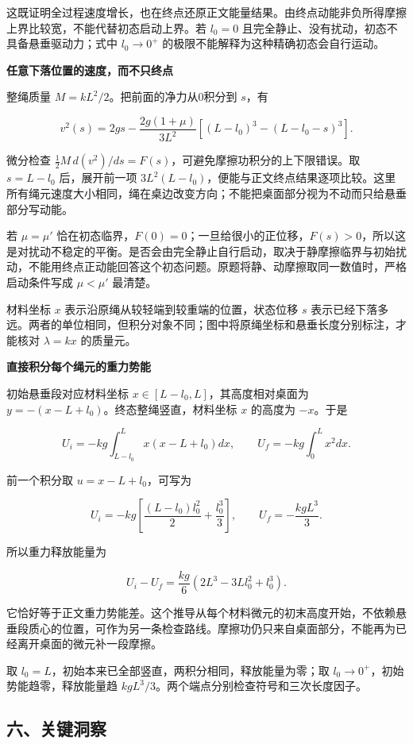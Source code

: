 \documentclass[12pt,a4paper,UTF8]{ctexart}
\begin{document}
这既证明全过程速度增长，也在终点还原正文能量结果。由终点动能非负所得摩擦上界比较宽，不能代替初态启动上界。若
\(l_0=0\) 且完全静止、没有扰动，初态不具备悬垂驱动力；式中 \(l_0\to0^+\)
的极限不能解释为这种精确初态会自行运动。

\textbf{任意下落位置的速度，而不只终点}

整绳质量 \(M=kL^2/2\)。把前面的净力从0积分到 \(s\)，有

\[v^2(s)=2gs-\frac{2g(1+\mu)}{3L^2}\left[(L-l_0)^3-(L-l_0-s)^3\right].\]

微分检查 \(\tfrac12M\,d(v^2)/ds=F(s)\)，可避免摩擦功积分的上下限错误。取
\(s=L-l_0\) 后，展开前一项
\(3L^2(L-l_0)\)，便能与正文终点结果逐项比较。这里所有绳元速度大小相同，绳在桌边改变方向；不能把桌面部分视为不动而只给悬垂部分写动能。

若 \(\mu=\mu'\)
恰在初态临界，\(F(0)=0\)；一旦给很小的正位移，\(F(s)>0\)，所以这是对扰动不稳定的平衡。是否会由完全静止自行启动，取决于静摩擦临界与初始扰动，不能用终点正动能回答这个初态问题。原题将静、动摩擦取同一数值时，严格启动条件写成
\(\mu<\mu'\) 最清楚。

材料坐标 \(x\) 表示沿原绳从较轻端到较重端的位置，状态位移 \(s\)
表示已经下落多远。两者的单位相同，但积分对象不同；图中将原绳坐标和悬垂长度分别标注，才能核对
\(\lambda=kx\) 的质量元。

\textbf{直接积分每个绳元的重力势能}

初始悬垂段对应材料坐标 \(x\in[L-l_0,L]\)，其高度相对桌面为
\(y=-(x-L+l_0)\)。终态整绳竖直，材料坐标 \(x\) 的高度为 \(-x\)。于是

\[U_i=-kg\int_{L-l_0}^{L}x(x-L+l_0)dx,\qquad U_f=-kg\int_0^Lx^2dx.\]

前一个积分取 \(u=x-L+l_0\)，可写为

\[U_i=-kg\left[\frac{(L-l_0)l_0^2}{2}+\frac{l_0^3}{3}\right],\qquad U_f=-\frac{kgL^3}{3}.\]

所以重力释放能量为

\[U_i-U_f=\frac{kg}{6}(2L^3-3Ll_0^2+l_0^3).\]

它恰好等于正文重力势能差。这个推导从每个材料微元的初末高度开始，不依赖悬垂段质心的位置，可作为另一条检查路线。摩擦功仍只来自桌面部分，不能再为已经离开桌面的微元补一段摩擦。

取 \(l_0=L\)，初始本来已全部竖直，两积分相同，释放能量为零；取
\(l_0\to0^+\)，初始势能趋零，释放能量趋
\(kgL^3/3\)。两个端点分别检查符号和三次长度因子。

\subsection{六、关键洞察}\label{ux516dux5173ux952eux6d1eux5bdf-2}
\end{document}
